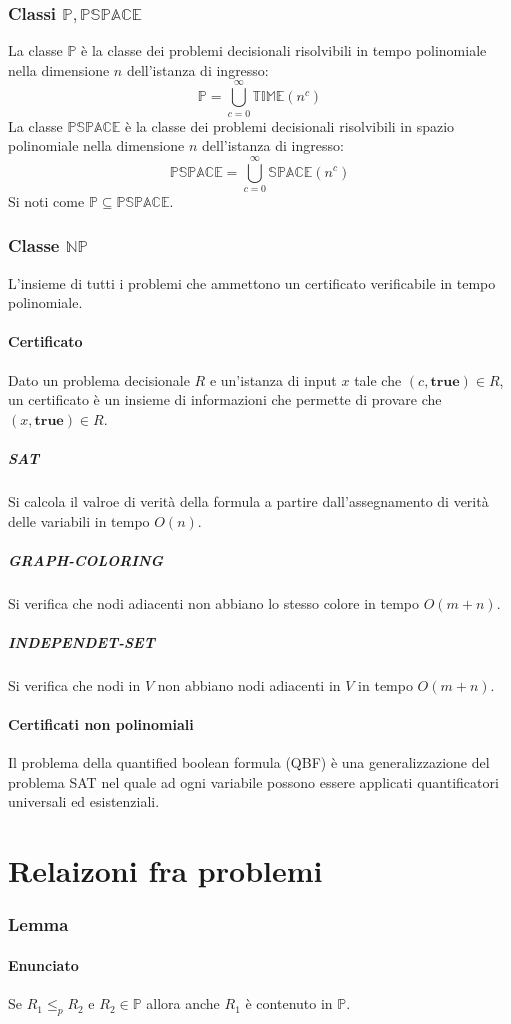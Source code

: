 \subsubsection{Classi $\mathbf{\mathbb{P}}, \mathbf{\mathbb{PSPACE}}$}
La classe $\mathbb{P}$ \`e la classe dei problemi decisionali risolvibili in tempo polinomiale nella dimensione $n$ dell'istanza di ingresso:
$$\mathbb{P} = \bigcup\limits_{c=0}^\infty\mathbb{TIME}(n^c)$$
La classe $\mathbb{PSPACE}$ \`e la classe dei problemi decisionali risolvibili in spazio polinomiale nella dimensione $n$ dell'istanza di ingresso:
$$\mathbb{PSPACE}=\bigcup\limits_{c=0}^\infty\mathbb{SPACE}(n^c)$$
Si noti come $\mathbb{P}\subseteq\mathbb{PSPACE}$.
\subsubsection{Classe $\mathbf{\mathbb{NP}}$}
L'insieme di tutti i problemi che ammettono un certificato verificabile in tempo polinomiale.
\paragraph{Certificato}
Dato un problema decisionale $R$ e un'istanza di input $x$ tale che $(c, \mathbf{true})\in R$, un certificato \`e un insieme di informazioni che permette di provare che $(x, 
\mathbf{true})\in R$.
\subparagraph{SAT}
Si calcola il valroe di verit\`a della formula a partire dall'assegnamento di verit\`a delle variabili in tempo $O(n)$.
\subparagraph{GRAPH-COLORING}
Si verifica che nodi adiacenti non abbiano lo stesso colore in tempo $O(m+n)$.
\subparagraph{INDEPENDET-SET}	
Si verifica che nodi in $V$ non abbiano nodi adiacenti in $V$ in tempo $O(m+n)$.
\paragraph{Certificati non polinomiali}
Il problema della quantified boolean formula (QBF) \`e una generalizzazione del problema SAT nel quale ad ogni variabile possono essere applicati quantificatori universali ed 
esistenziali.
\section{Relaizoni fra problemi}
\subsubsection{Lemma}
\paragraph{Enunciato}
Se $R_1\le_p R_2$ e $R_2\in\mathbb{P}$ allora anche $R_1$ \`e contenuto in $\mathbb{P}$.

